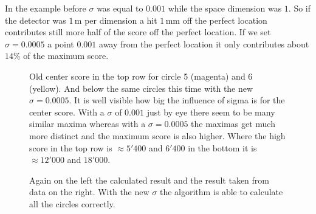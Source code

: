 \documentclass[11pt,twoside]{scrreprt}
\begin{document}
In the example before $\sigma$ was equal to $0.001$ while the space dimension was $1$. So if the detector was $1$\,m per dimension a hit $1$\,mm off the perfect location contributes still more half of the score off the perfect location. If we set $\sigma=0.0005$ a point $0.001$ away from the perfect location it only contributes about $14\%$ of the maximum score.

\begin{figure}
\centering
 
  \caption[2D HT: Comparison center scores 6 circles, 200 background hits]{Old center score in the top row for circle 5 (magenta) and 6 (yellow). And below the same circles this time with the new $\sigma=0.0005$. It is well visible how big the influence of sigma is for the center score. With a $\sigma$ of $0.001$ just by eye there seem to be many similar maxima whereas with a $\sigma=0.0005$ the maximas get much more distinct and the maximum score is also higher. Where the high score in the top row is $\approx 5'400$ and $6'400$ in the bottom it is $\approx 12'000$ and $18'000$.}
\end{figure}


\begin{figure}
\centering
\caption[2D HT: Comparison result, 6 circles, 200 background hits]{Again on the left the calculated result and the result taken from data on the right. With the new $\sigma$ the algorithm is able to calculate all the circles correctly.}\label{2d_result_6c_200bg_corr}
\end{figure}

\clearpage
\end{document}
